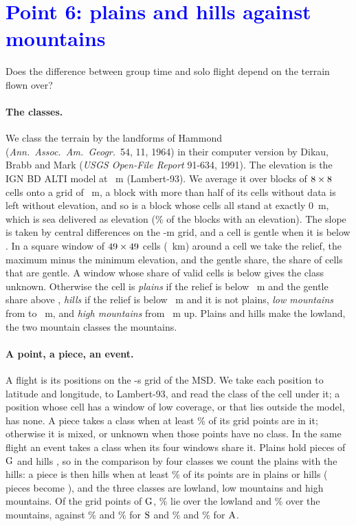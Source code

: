 \section{\texorpdfstring{\textcolor{blue}{Point 6: plains and hills against mountains}}{Point 6: plains and hills against mountains}}\label{sec:terrain}

Does the difference between group time and solo flight depend on the terrain flown over?

\paragraph{The classes.} We class the terrain by the landforms of Hammond (\emph{Ann.\ Assoc.\ Am.\ Geogr.}\ 54, 11, 1964) in their computer version by Dikau, Brabb and Mark (\emph{USGS Open-File Report} 91-634, 1991). The elevation is the IGN BD ALTI model at \TnSource~m (Lambert-93). We average it over blocks of $8\times8$ cells onto a grid of \TnCell~m, a block with more than half of its cells without data is left without elevation, and so is a block whose cells all stand at exactly 0~m, which is sea delivered as elevation (\TnMaskedShare\% of the blocks with an elevation). The slope is taken by central differences on the \TnCell-m grid, and a cell is gentle when it is below \TnGentle. In a square window of $49\times49$ cells (\TnWindowKm~km) around a cell we take the relief, the maximum minus the minimum elevation, and the gentle share, the share of cells that are gentle. A window whose share of valid cells is below \TnCoverage{} gives the class unknown. Otherwise the cell is
\emph{plains} if the relief is below \TnPlainsRelief~m and the gentle share above \TnPlainsGentle, \emph{hills} if the relief is below \TnHillsRelief~m and it is not plains, \emph{low mountains} from \TnHillsRelief{} to \TnLowRelief~m, and \emph{high mountains} from \TnLowRelief~m up. Plains and hills make the lowland, the two mountain classes the mountains.

\paragraph{A point, a piece, an event.} A flight is its positions on the \TnGridStep-s grid of the MSD. We take each position to latitude and longitude, to Lambert-93, and read the class of the cell under it; a position whose cell has a window of low coverage, or that lies outside the model, has none. A piece takes a class when at least \TnMajority\% of its grid points are in it; otherwise it is mixed, or unknown when those points have no class. In the same flight an event takes a class when its four windows share it. Plains hold \TnPiecesPlainsG{} pieces of $\mathrm{G}$ and hills \TnPiecesHillsG, so in the comparison by four classes we count the plains with the hills: a piece is then hills when at least \TnMajority\% of its points are in plains or hills (\TnMergedFrom{} pieces become \TnMergedTo), and the three classes are lowland, low mountains and high mountains. Of the grid points of $\mathrm{G}$, \TnShareLowlandG\% lie over the lowland and \TnShareMountainG\% over the mountains, against \TnShareLowlandS\% and \TnShareMountainS\% for $\mathrm{S}$ and \TnShareLowlandA\% and \TnShareMountainA\% for $\mathrm{A}$.


